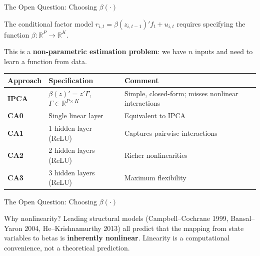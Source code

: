\documentclass[aspectratio=169, 10pt]{beamer}
\begin{document}
%
%
\begin{frame}{The Open Question: Choosing $\beta(\cdot)$}

The conditional factor model $r_{i,t} = \beta(z_{i,t-1})' f_t + u_{i,t}$ requires
specifying the function $\beta: \mathbb{R}^P \to \mathbb{R}^K$.

\bigskip
This is a \textbf{non-parametric estimation problem}: we have $n$ inputs and
need to learn a function from data.

\bigskip
\begin{center}
\begin{tabular}{p{2.8cm} p{3.8cm} p{4.2cm}}
\toprule
\textbf{Approach} & \textbf{Specification} & \textbf{Comment} \\
\midrule
\textbf{IPCA}
  & $\beta(z)' = z'\Gamma$, \quad $\Gamma \in \mathbb{R}^{P\times K}$
  & Simple, closed-form; misses nonlinear interactions \\[8pt]
\textbf{CA0}
  & Single linear layer
  & Equivalent to IPCA \\[8pt]
\textbf{CA1}
  & 1 hidden layer (ReLU)
  & Captures pairwise interactions \\[8pt]
\textbf{CA2}
  & 2 hidden layers (ReLU)
  & Richer nonlinearities \\[8pt]
\textbf{CA3}
  & 3 hidden layers (ReLU)
  & Maximum flexibility \\
\bottomrule
\end{tabular}
\end{center}
\end{frame}
%
%
\begin{frame}{The Open Question: Choosing $\beta(\cdot)$}
\begin{exampleblock}{Why nonlinearity?}
Leading structural models (Campbell--Cochrane 1999, Bansal--Yaron 2004,
He--Krishnamurthy 2013) all predict that the mapping from state variables to betas
is \textbf{inherently nonlinear}. Linearity is a computational convenience, not a
theoretical prediction.
\end{exampleblock}

\end{frame}
%
%
\end{document}
